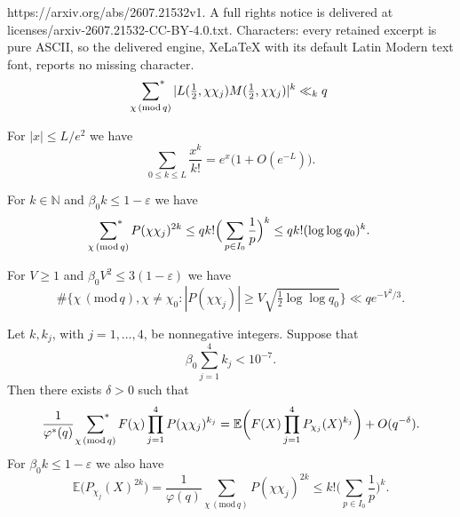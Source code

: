 \documentclass[10pt,a4paper]{amsart}
\def\sumstar{\sideset{}{^*}\sum}
\newcommand{\E}{\mathbb{E}}
\renewcommand{\pmod}[1]{\,(\mathrm{mod}\,#1)}
\begin{document}
https://arxiv.org/abs/2607.21532v1. A full rights notice is delivered at licenses/arxiv-2607.21532-CC-BY-4.0.txt. Characters: every retained excerpt is pure ASCII, so the delivered engine, XeLaTeX with its default Latin Modern text font, reports no missing character.
\begin{equation}\label{upperbd}
\sumstar_{\chi \pmod q}|L(\tfrac12,\chi\chi_j)M(\tfrac12,\chi\chi_j)|^k\ll_k q
\end{equation}

\begin{lemma}\label{exptrunc}
For $|x|\leq L/e^2$ we have
\begin{equation*}
\sum_{0\leq k\leq L} \frac{x^k}{k!}=e^{x}\big(1+O( e^{-L})\big).
\end{equation*}
\end{lemma}

\begin{lemma} \label{momentsP}
For $k\in\mathbb{N}$ and $\beta_0k \le 1-\varepsilon$ %
we have
\begin{equation*}
\sumstar_{\substack{\chi \pmod q}}  P(\chi\chi_j)^{2k} \le qk! \Big(\sum_{p\in I_0} \frac{1}{p} \Big)^k\leq qk!(\log\log q_0)^k.
\end{equation*}
\end{lemma}

\begin{lemma} \label{lem:largedev}
For $V \ge 1$ and $\beta_0V^2\leq 3(1-\varepsilon)$ we have
\[
\# \bigg\{ \chi \pmod q,\chi\ne\chi_0 : |P(\chi\chi_j)| \ge V \sqrt{\tfrac12 \log \log q_0} \bigg\} \ll q e^{-V^2/3}.
\]
\end{lemma}

\begin{lemma}
\label{lem_expectation}
Let $k,k_j$, with $j=1,\ldots,4$, be nonnegative integers. Suppose that $$\beta_0 \sum_{j=1}^4 k_j < 10^{-7}.$$ Then there exists $\delta>0$ such that
\begin{equation}  \label{first} \frac{1}{\varphi^{*}(q)}\ \sumstar_{\chi \pmod q} F(\chi) \prod_{j=1}^4 P(\chi \chi_j)^{k_j}= \E \bigg( F(X) \prod_{j=1}^4 P_{\chi_j}(X)^{k_j}\bigg) + O ( q^{-\delta}).\end{equation}
  For $\beta_0k \leq 1-\varepsilon$ %
  we also have
  \begin{equation}\label{second} \E \Big(  P_{\chi_j}(X)^{2k}\Big) =\frac{1}{\varphi(q)} \sum_{\chi \pmod q} P(\chi \chi_j)^{2k}\leq k! \Big(\sum_{p \in I_0} \frac{1}{p} \Big)^k.
  \end{equation}
\end{lemma}
\end{document}
